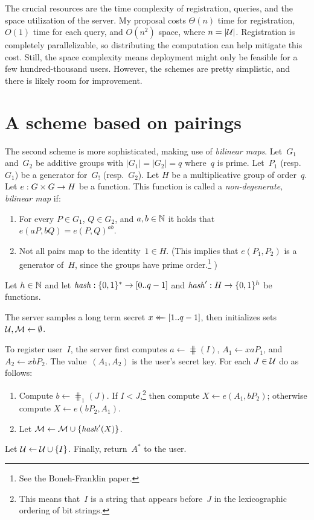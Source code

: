 \documentclass{build/llncs}
\begin{document}
The crucial resources are the time complexity of registration, queries, and the
space utilization of the server.
%
My proposal costs $\Theta(n)$ time for registration, $O(1)$ time for each query,
and $O(n^2)$ space, where $n=|\mathcal{U}|$.
%
Registration is completely parallelizable, so distributing the computation can
help mitigate this cost.
%
Still, the space complexity means deployment might only be feasible for a few
hundred-thousand users. However, the schemes are pretty simplistic, and there
is likely room for improvement.

\section*{A scheme based on pairings}

The second scheme is more sophisticated, making use of \emph{bilinear maps}.
%
Let~$G_1$ and~$G_2$ be additive groups with $|G_1|=|G_2|=q$ where~$q$ is prime.
Let~$P_1$ (resp.~$G_1$) be a generator for~$G_!$ (resp.~$G_2$).
%
Let $H$ be a multiplicative group of order~$q$.
%
Let $e : G \times G \to H$ be a function. This function is called a
\emph{non-degenerate, bilinear map} if:
\begin{enumerate}
  \item For every $P \in G_1$, $Q \in G_2$, and $a, b \in \mathbb{N}$ it holds that $e(aP, bQ) = e(P,
    Q)^{ab}$.
  \item Not all pairs map to the identity~$1\in H$. (This implies that
    $e(P_1, P_2)$ is a generator of~$H$, since the
    groups have prime order.\footnote{See the Boneh-Franklin paper.}
    )
\end{enumerate}
%
Let $h\in\mathbb{N}$ and let $\mathit{hash}: \{0,1\}^* \to [0..q-1]$ and $\mathit{hash}' : H \to
\{0,1\}^h$ be functions.

%
The server samples a long term secret $x \mathrel{\leftarrow\mkern-14mu\leftarrow} [1..q-1]$, then
initializes sets~$\mathcal{U}, \mathcal{M} \gets \emptyset$.

%
To register user~$I$, the server first computes $a \gets \hash(I)$, $A_1 \gets
xaP_1$, and $A_2 \gets xbP_2$.
The value~$(A_1, A_2)$ is the user's secret key.
%
For each $J \in \mathcal{U}$ do as follows:
%
\begin{enumerate}
  \item Compute $b \gets \hash_1(J)$. If $I < J$,\footnote{This means that~$I$ is a
    string that appears before~$J$ in the lexicographic ordering of bit
    strings.} then compute $X \gets e(A_1, bP_2)$; otherwise compute $X \gets
    e(bP_2, A_1)$.
  \item Let $\mathcal{M} \gets \mathcal{M} \cup \{\mathit{hash}'(X)\}$.
\end{enumerate}
%
Let $\mathcal{U} \gets \mathcal{U} \cup \{I\}$.
%
Finally, return~$A^*$ to the user.
\end{document}
